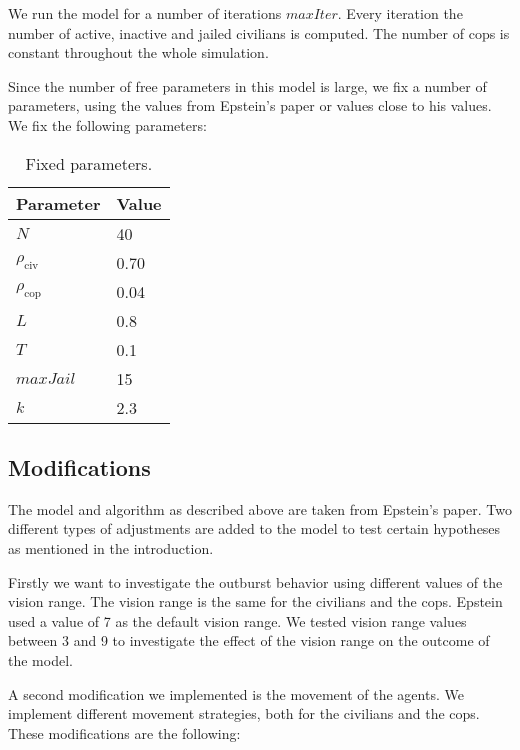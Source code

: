 \documentclass[11pt,a4paper,onecolumn]{article}
\begin{document}
We run the model for a number of iterations $maxIter$. Every iteration the number of active, inactive and jailed civilians is computed. The number of cops is constant throughout the whole simulation.

Since the number of free parameters in this model is large, we fix a number of parameters, using the values from Epstein's paper or values close to his values. We fix the following parameters:

\begin{table}[H]
  \centering
  \begin{tabular}{l | l}
    Parameter & Value \\
    \hline
    $N$ & 40 \\
    $\rho_{\text{civ}}$ & 0.70 \\
    $\rho_{\text{cop}} $ & 0.04 \\
    $L$ & 0.8 \\
    $T$ & 0.1 \\
    $maxJail$ & 15 \\
    $k$ & 2.3 \\
  \end{tabular}
  \caption{Fixed parameters.}
  \label{tab:param}
\end{table}

\subsection{Modifications}
The model and algorithm as described above are taken from Epstein's paper. Two different types of adjustments are added to the model to test certain hypotheses as mentioned in the introduction.

Firstly we want to investigate the outburst behavior using different values of the vision range. The vision range is the same for the civilians and the cops. Epstein used a value of 7 as the default vision range. We tested vision range values between 3 and 9 to investigate the effect of the vision range on the outcome of the model.

A second modification we implemented is the movement of the agents. We implement different movement strategies, both for the civilians and the cops. These modifications are the following:
\end{document}
